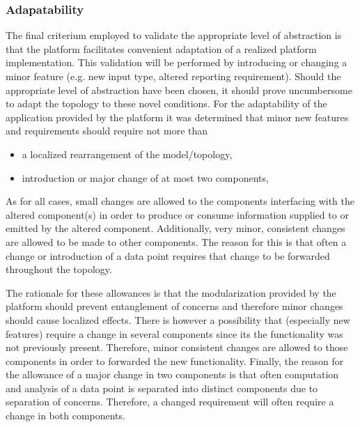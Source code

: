 \subsubsection{Adapatability}
The final criterium employed to validate the appropriate level of abstraction is that the platform facilitates convenient adaptation of a realized platform implementation. This validation will be performed by introducing or changing a minor feature (e.g. new input type, altered reporting requirement). Should the appropriate level of abstraction have been chosen, it should prove uncumbersome to adapt the topology to these novel conditions. For the adaptability of the application provided by the platform it was determined that minor new features and requirements should require not more than
\begin{itemize}
\nospace
\item a localized rearrangement of the model/topology, 
\item introduction or major change of at most two components, 
\end{itemize}
As for all cases, small changes are allowed to the components interfacing with the altered component(s) in order to produce or consume information supplied to or emitted by the altered component. Additionally, very minor, consistent changes are allowed to be made to other components. The reason for this is that often a change or introduction of a data point requires that change to be forwarded throughout the topology.

The rationale for these allowances is that the modularization provided by the platform should prevent entanglement of concerns and therefore minor changes should cause localized effects. There is however a possibility that (especially new features) require a change in several components since its the functionality was not previously present. Therefore, minor consistent changes are allowed to those components in order to forwarded the new functionality. Finally, the reason for the allowance of a major change in two components is that often computation and analysis of a data point is separated into distinct components due to separation of concerns. Therefore, a changed requirement will often require a change in both components.



